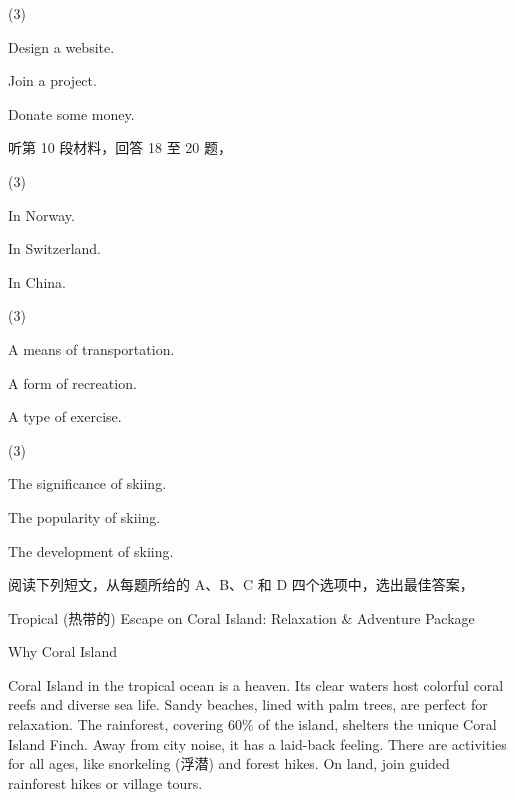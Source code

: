 \documentclass{英语试卷}
\begin{document}
\begin{choices}(3)
  \item Design a website.
  \item Join a project.
  \item Donate some money.
\end{choices}
\par 听第 10 段材料，回答 18 至 20 题，\par
{}
\begin{choices}(3)
  \item In Norway.
  \item In Switzerland.
  \item In China.
\end{choices}
\begin{choices}(3)
  \item A means of transportation.
  \item A form of recreation.
  \item A type of exercise.
\end{choices}
\begin{choices}(3)
  \item The significance of skiing.
  \item The popularity of skiing.
  \item The development of skiing.
\end{choices}
\par 阅读下列短文，从每题所给的 A、B、C 和 D 四个选项中，选出最佳答案，\par
{}
\par Tropical (热带的) Escape on Coral Island: Relaxation \& Adventure Package\par
\par Why Coral Island\par
\par Coral Island in the tropical ocean is a heaven. Its clear waters host colorful coral reefs and diverse sea life. Sandy beaches, lined with palm trees, are perfect for relaxation. The rainforest, covering 60\% of the island, shelters the unique Coral Island Finch. Away from city noise, it has a laid-back feeling. There are activities for all ages, like snorkeling (浮潜) and forest hikes. On land, join guided rainforest hikes or village tours.\par
\end{document}
